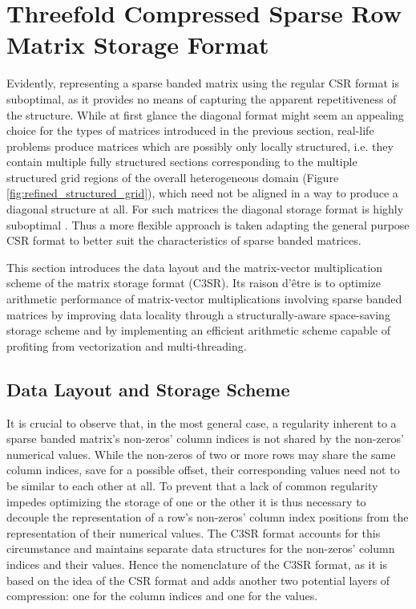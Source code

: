 \chapter{Threefold Compressed Sparse Row Matrix Storage Format}

  Evidently, representing a sparse banded matrix using the regular CSR format is suboptimal, as it provides no means of
  capturing the apparent repetitiveness of the structure. While at first glance the diagonal format might seem an
  appealing choice for the types of matrices introduced in the previous section, real-life problems produce matrices
  which are possibly only locally structured, i.e. they contain multiple fully structured sections corresponding to the
  multiple structured grid regions of the overall heterogeneous domain (Figure \ref{fig:refined_structured_grid}), which
  need not be aligned in a way to produce a diagonal structure at all. For such matrices the diagonal storage format is
  highly suboptimal \cite{Bell2011}. Thus a more flexible approach is taken adapting the general purpose CSR format to
  better suit the characteristics of sparse banded matrices.

  This section introduces the data layout and the matrix-vector multiplication scheme of the  matrix storage format (C3SR). Its raison d'être is to optimize arithmetic performance of matrix-vector
  multiplications involving sparse banded matrices by improving data locality through a structurally-aware space-saving
  storage scheme and by implementing an efficient arithmetic scheme capable of profiting from vectorization and
  multi-threading.

  \section{Data Layout and Storage Scheme}


    It is crucial to observe that, in the most general case, a regularity inherent to a sparse banded matrix's
    non-zeros' column indices is not shared by the non-zeros' numerical values. While the non-zeros of two or more rows
    may share the same column indices, save for a possible offset, their corresponding values need not to be similar to
    each other at all. To prevent that a lack of common regularity impedes optimizing the storage of one or the other it
    is thus necessary to decouple the representation of a row's non-zeros' column index positions from the
    representation of their numerical values. The C3SR format accounts for this circumstance and maintains separate data
    structures for the non-zeros' column indices and their values. Hence the nomenclature of the C3SR format, as it is
    based on the idea of the CSR format and adds another two potential layers of compression: one for the column indices
    and one for the values.

